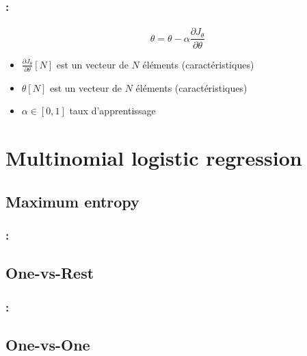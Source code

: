 \documentclass[xcolor=table]{beamer}
\begin{document}
\begin{frame}
	\frametitle{\insertshortsubtitle: \insertsection}
	\framesubtitle{\insertsubsection}
	
	\[\theta = \theta - \alpha \frac{\partial J_\theta}{\partial \theta}\]
	
	\begin{itemize}
		\item $\frac{\partial J_\theta}{\partial \theta}[N]$ est un vecteur de $N$ éléments (caractéristiques)
		\item $\theta[N]$ est un vecteur de $N$ éléments (caractéristiques)
		\item $\alpha \in [0, 1]$ taux d'apprentissage
	\end{itemize}
	
\end{frame}

\section{Multinomial logistic regression}

\begin{frame}
	\frametitle{\insertshortsubtitle}
	\framesubtitle{\insertsection}
	
	
\end{frame}

\subsection{Maximum entropy}

\begin{frame}
	\frametitle{\insertshortsubtitle: \insertsection}
	\framesubtitle{\insertsubsection}
	
	
\end{frame}

\subsection{One-vs-Rest}

\begin{frame}
	\frametitle{\insertshortsubtitle: \insertsection}
	\framesubtitle{\insertsubsection}
	
	
\end{frame}

\subsection{One-vs-One}
\end{document}
